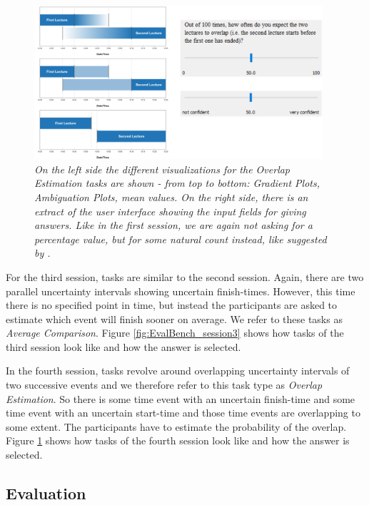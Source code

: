 \begin{figure}[H]
	\centering
	\includegraphics[width=0.95\textwidth]{figures/EvalBench_session4.png}
	\caption{\textit{On the left side the different visualizations for the Overlap Estimation tasks are shown - from top to bottom: Gradient Plots, Ambiguation Plots, mean values. On the right side, there is an extract of the user interface showing the input fields for giving answers. Like in the first session, we are again not asking for a percentage value, but for some natural count instead, like suggested by \citet{hullman2016evaluating}.}}
	\label{fig:EvalBench_session4}
\end{figure}

For the third session, tasks are similar to the second session. Again, there are two parallel uncertainty intervals showing uncertain finish-times. However, this time there is no specified point in time, but instead the participants are asked to estimate which event will finish sooner on average. We refer to these tasks as \textit{Average Comparison}. Figure \ref{fig:EvalBench_session3} shows how tasks of the third session look like and how the answer is selected. \par \medskip

In the fourth session, tasks revolve around overlapping uncertainty intervals of two successive events and we therefore refer to this task type as \textit{Overlap Estimation}. So there is some time event with an uncertain finish-time and some time event with an uncertain start-time and those time events are overlapping to some extent. The participants have to estimate the probability of the overlap. Figure \ref{fig:EvalBench_session4} shows how tasks of the fourth session look like and how the answer is selected. \par \medskip


\subsection*{Evaluation}

